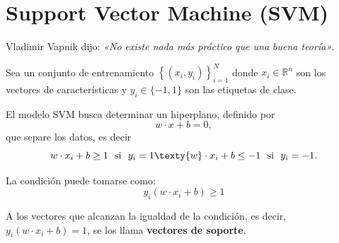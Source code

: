 \documentclass[a4,11pt]{aleph-notas}
\begin{document}
\encabezado


\section{Support Vector Machine (SVM)}

Vladimir Vapnik dijo: \textit{«No existe nada más práctico que una buena teoría»}.

\begin{defi}
Sea un conjunto de entrenamiento $\left\{({x}_i, y_i)\right\}_{i=1}^N$ donde ${x}_i \in \mathbb{R}^n$ son los vectores de características y $y_i \in \{-1, 1\}$ son las etiquetas de clase.

El modelo SVM busca determinar un hiperplano, definido por $${w} \cdot {x} + b = 0,$$ que separe los datos, es decir
\[
    {w} \cdot {x}_i + b \geq 1\ \text{ si }\ y_i = 1
    \texty
    {w} \cdot {x}_i + b \leq -1\ \text{ si }\ y_i = -1.
\]
\end{defi}

\begin{advertencia}
La condición puede tomarse como:
    $$y_i ({w} \cdot {x}_i + b) \geq 1$$
\end{advertencia}

\begin{advertencia}
A los vectores que alcanzan la igualdad de la condición, es decir, $y_i ({w} \cdot {x}_i + b) = 1$, se los llama \textbf{vectores de soporte}.
\end{advertencia}
\end{document}
